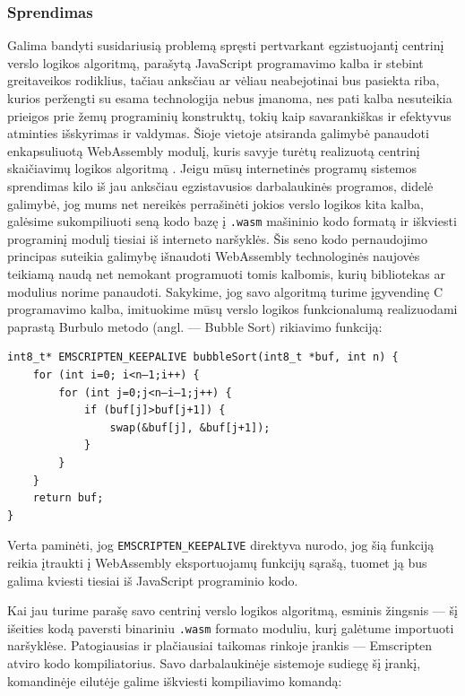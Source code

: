 \documentclass{VUMIFPSkursinis}
\begin{document}
\subsubsection{Sprendimas}
Galima bandyti susidariusią problemą spręsti pertvarkant egzistuojantį centrinį verslo logikos algoritmą, parašytą JavaScript programavimo kalba ir stebint greitaveikos rodiklius, tačiau anksčiau ar vėliau neabejotinai bus pasiekta riba, kurios peržengti su esama technologija nebus įmanoma, nes pati kalba nesuteikia prieigos prie žemų programinių konstruktų, tokių kaip savarankiškas ir efektyvus atminties išskyrimas ir valdymas. 
Šioje vietoje atsiranda galimybė panaudoti enkapsuliuotą WebAssembly modulį, kuris savyje turėtų realizuotą centrinį skaičiavimų logikos algoritmą \cite{Cal17}. Jeigu mūsų internetinės programų sistemos sprendimas kilo iš jau anksčiau egzistavusios darbalaukinės programos, didelė galimybė, jog mums net nereikės perrašinėti jokios verslo logikos kita kalba, galėsime sukompiliuoti seną kodo bazę į \verb|.wasm| mašininio kodo formatą ir iškviesti programinį modulį tiesiai iš interneto naršyklės. Šis seno kodo pernaudojimo principas suteikia galimybę išnaudoti WebAssembly technologinės naujovės teikiamą naudą net nemokant programuoti tomis kalbomis, kurių bibliotekas ar modulius norime panaudoti. Sakykime, jog savo algoritmą turime įgyvendinę C programavimo kalba, imituokime mūsų verslo logikos funkcionalumą realizuodami paprastą Burbulo metodo (angl. — Bubble Sort) rikiavimo funkciją:

\begin{center}
\begin{small}
\begin{verbatim}
int8_t* EMSCRIPTEN_KEEPALIVE bubbleSort(int8_t *buf, int n) {
    for (int i=0; i<n—1;i++) {
        for (int j=0;j<n—i—1;j++) {
            if (buf[j]>buf[j+1]) {
                swap(&buf[j], &buf[j+1]);
            }
        }
    }
    return buf;
}
\end{verbatim}
\end{small}
\end{center}

Verta paminėti, jog \verb|EMSCRIPTEN_KEEPALIVE| direktyva nurodo, jog šią funkciją reikia įtraukti į WebAssembly eksportuojamų funkcijų sąrašą, tuomet ją bus galima kviesti tiesiai iš JavaScript programinio kodo. \cite{EMD17}

Kai jau turime parašę savo centrinį verslo logikos algoritmą, esminis žingsnis — šį išeities kodą paversti binariniu \verb|.wasm| formato moduliu, kurį galėtume importuoti naršyklėse. Patogiausias ir plačiausiai taikomas rinkoje įrankis — Emscripten atviro kodo kompiliatorius. Savo darbalaukinėje sistemoje sudiegę šį įrankį, komandinėje eilutėje galime iškviesti kompiliavimo komandą:
\end{document}
